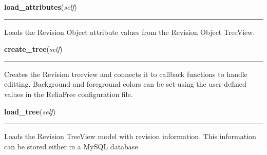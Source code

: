     \vspace{0.5ex}

\hspace{.8\funcindent}\begin{boxedminipage}{\funcwidth}

    \raggedright \textbf{load\_attributes}(\textit{self})

    \vspace{-1.5ex}

    \rule{\textwidth}{0.5\fboxrule}
\setlength{\parskip}{2ex}
    Loads the Revision Object attribute values from the Revision Object 
    TreeView.

\setlength{\parskip}{1ex}
    \end{boxedminipage}

    \label{reliafree:revision:Revision:create_tree}

    \vspace{0.5ex}

\hspace{.8\funcindent}\begin{boxedminipage}{\funcwidth}

    \raggedright \textbf{create\_tree}(\textit{self})

    \vspace{-1.5ex}

    \rule{\textwidth}{0.5\fboxrule}
\setlength{\parskip}{2ex}
    Creates the Revision treeview and connects it to callback functions to 
    handle editting.  Background and foreground colors can be set using the
    user-defined values in the ReliaFree configuration file.

\setlength{\parskip}{1ex}
    \end{boxedminipage}

    \label{reliafree:revision:Revision:load_tree}

    \vspace{0.5ex}

\hspace{.8\funcindent}\begin{boxedminipage}{\funcwidth}

    \raggedright \textbf{load\_tree}(\textit{self})

    \vspace{-1.5ex}

    \rule{\textwidth}{0.5\fboxrule}
\setlength{\parskip}{2ex}
    Loads the Revision TreeView model with revision information. This 
    information can be stored either in a MySQL database.

\setlength{\parskip}{1ex}
    \end{boxedminipage}

